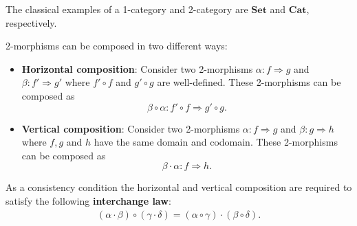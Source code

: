     \begin{example}
        The classical examples of a 1-category and 2-category are $\mathbf{Set}$ and $\mathbf{Cat}$, respectively.
    \end{example}

    \begin{property}
        2-morphisms can be composed in two different ways:
        \begin{itemize}
            \item\textbf{Horizontal composition}:
                Consider two 2-morphisms $\alpha:f\Rightarrow g$ and $\beta:f'\Rightarrow g'$ where $f'\circ f$ and $g'\circ g$ are well-defined. These 2-morphisms can be composed as \[\beta\circ\alpha: f'\circ f\Rightarrow g'\circ g.\]
            \item\textbf{Vertical composition}:
                Consider two 2-morphisms $\alpha:f\Rightarrow g$ and $\beta:g\Rightarrow h$ where $f,g$ and $h$ have the same domain and codomain. These 2-morphisms can be composed as \[\beta\cdot\alpha:f\Rightarrow h.\]
        \end{itemize}
        As a consistency condition the horizontal and vertical composition are required to satisfy the following \textbf{interchange law}:
        \begin{gather}
            (\alpha\cdot\beta)\circ(\gamma\cdot\delta) = (\alpha\circ\gamma)\cdot(\beta\circ\delta).
        \end{gather}
    \end{property}


